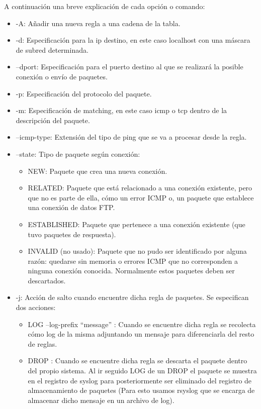 A continuación una breve explicación de cada opción o comando:
\begin{itemize}
\item -A: Añadir una nueva regla a una cadena de la tabla.
\item -d: Especificación para la ip destino, en este caso localhost con una máscara de subred determinada.
\item --dport: Especificación para el puerto destino al que se realizará la posible conexión o envío de paquetes.
\item -p: Especificación del protocolo del paquete.
\item -m: Especificación de matching, en este caso icmp o tcp dentro de la descripción del paquete.
\item --icmp-type: Extensión del tipo de ping que se va a procesar desde la regla.
\item --state: Tipo de paquete según conexión:
  \begin{itemize}
  \item NEW: Paquete que crea una nueva conexión.
  \item RELATED: Paquete que está relacionado a una conexión existente, pero que no es parte de ella, cómo un error ICMP o, un paquete que establece una conexión de datos FTP.
  \item ESTABLISHED: Paquete que pertenece a una conexión existente (que tuvo paquetes de respuesta).
  \item INVALID (no usado): Paquete que no pudo ser identificado por alguna razón: quedarse sin memoria o errores ICMP que no corresponden a ninguna conexión conocida. Normalmente estos paquetes deben ser descartados.
  \end{itemize}
\item -j: Acción de salto cuando encuentre dicha regla de paquetes. Se especifican dos acciones:
  \begin{itemize}
  \item LOG --log-prefix ``message'' : Cuando se encuentre dicha regla se recolecta cómo log de la misma adjuntando un mensaje para diferenciarla del resto de reglas.
  \item DROP : Cuando se encuentre dicha regla se descarta el paquete dentro del propio sistema. Al ir seguido LOG de un DROP el paquete se muestra en el registro de syslog para posteriormente ser eliminado del registro de almacenamiento de paquetes (Para esto usamos rsyslog que se encarga de almacenar dicho mensaje en un archivo de log).
  \end{itemize}
\end{itemize}

